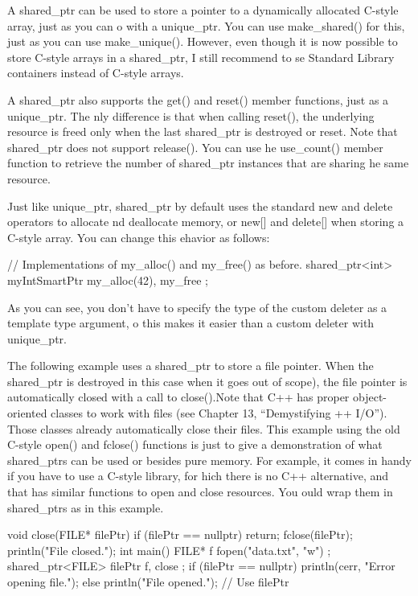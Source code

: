 A shared\_ptr can be used to store a pointer to a dynamically allocated C-style array, just as you can o with a unique\_ptr. You can use make\_shared() for this, just as you can use make\_unique(). However, even though it is now possible to store C-style arrays in a shared\_ptr, I still recommend to se Standard Library containers instead of C-style arrays.

A shared\_ptr also supports the get() and reset() member functions, just as a unique\_ptr. The nly difference is that when calling reset(), the underlying resource is freed only when the last shared\_ptr is destroyed or reset. Note that shared\_ptr does not support release(). You can use he use\_count() member function to retrieve the number of shared\_ptr instances that are sharing he same resource.

Just like unique\_ptr, shared\_ptr by default uses the standard new and delete operators to allocate nd deallocate memory, or new[] and delete[] when storing a C-style array. You can change this ehavior as follows:

\begin{cpp}
// Implementations of my_alloc() and my_free() as before.
shared_ptr<int> myIntSmartPtr { my_alloc(42), my_free };
\end{cpp}

As you can see, you don’t have to specify the type of the custom deleter as a template type argument, o this makes it easier than a custom deleter with unique\_ptr.

The following example uses a shared\_ptr to store a file pointer. When the shared\_ptr is destroyed in this case when it goes out of scope), the file pointer is automatically closed with a call to close().Note that C++ has proper object-oriented classes to work with files (see Chapter 13, “Demystifying ++ I/O”). Those classes already automatically close their files. This example using the old C-style open() and fclose() functions is just to give a demonstration of what shared\_ptrs can be used or besides pure memory. For example, it comes in handy if you have to use a C-style library, for hich there is no C++ alternative, and that has similar functions to open and close resources. You ould wrap them in shared\_ptrs as in this example.

\begin{cpp}
void close(FILE* filePtr)
{
    if (filePtr == nullptr) { return; }
    fclose(filePtr);
    println("File closed.");
}
int main()
{
    FILE* f { fopen("data.txt", "w") };
    shared_ptr<FILE> filePtr { f, close };
    if (filePtr == nullptr) {
        println(cerr, "Error opening file.");
    } else {
        println("File opened.");
        // Use filePtr
    }
}
\end{cpp}


